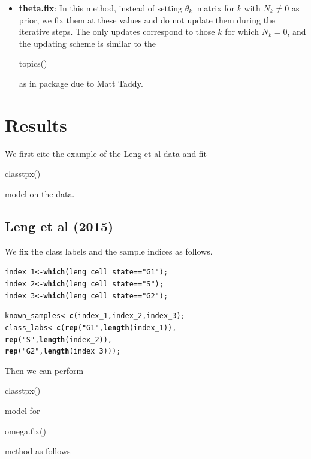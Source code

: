 \documentclass[12pt]{article}\usepackage[]{graphicx}\usepackage[usenames,dvipsnames]{color}
\makeatletter
\newcommand{\hlstr}[1]{\textcolor[rgb]{0.192,0.494,0.8}{#1}}%
\newcommand{\hlopt}[1]{\textcolor[rgb]{0,0,0}{#1}}%
\newcommand{\hlstd}[1]{\textcolor[rgb]{0.345,0.345,0.345}{#1}}%
\newcommand{\hlkwb}[1]{\textcolor[rgb]{0.69,0.353,0.396}{#1}}%
\newcommand{\hlkwd}[1]{\textcolor[rgb]{0.737,0.353,0.396}{\textbf{#1}}}%
\newenvironment{kframe}{%
 \def\at@end@of@kframe{}%
 \ifinner\ifhmode%
  \def\at@end@of@kframe{\end{minipage}}%
  \begin{minipage}{\columnwidth}%
 \fi\fi%
 \def\FrameCommand##1{\hskip\@totalleftmargin \hskip-\fboxsep
 \colorbox{shadecolor}{##1}\hskip-\fboxsep
     \hskip-\linewidth \hskip-\@totalleftmargin \hskip\columnwidth}%
 \MakeFramed {\advance\hsize-\width
   \@totalleftmargin\z@ \linewidth\hsize
   \@setminipage}}%
 {\par\unskip\endMakeFramed%
 \at@end@of@kframe}
\newenvironment{knitrout}{}{} %
\makeatother
\begin{document}
\begin{itemize}
\item \textbf{theta.fix}: In this method, instead of setting $\theta_{k.}$ matrix for $k$ with $N_{k} \neq 0$ as prior, we fix them at these values and do not update them during the iterative steps. The only updates correspond to those $k$ for which $N_{k} = 0$, and the updating scheme is similar to the \begin{verb} topics() \end{verb} as in  package due to Matt Taddy.
\end{itemize}

\section{Results}

We first cite the example of the Leng et al data and fit \begin{verb} classtpx() \end{verb} model on the data. 

\subsection{Leng et al (2015)}

We fix the class labels and the sample indices as follows.

\begin{knitrout}
\color{fgcolor}\begin{kframe}
\begin{alltt}
\hlstd{index_1} \hlkwb{<-} \hlkwd{which}\hlstd{(leng_cell_state}\hlopt{==}\hlstr{"G1"}\hlstd{);}
\hlstd{index_2} \hlkwb{<-} \hlkwd{which}\hlstd{(leng_cell_state}\hlopt{==}\hlstr{"S"}\hlstd{);}
\hlstd{index_3} \hlkwb{<-} \hlkwd{which}\hlstd{(leng_cell_state}\hlopt{==}\hlstr{"G2"}\hlstd{);}

\hlstd{known_samples} \hlkwb{<-} \hlkwd{c}\hlstd{(index_1, index_2, index_3);}
\hlstd{class_labs} \hlkwb{<-} \hlkwd{c}\hlstd{(}\hlkwd{rep}\hlstd{(}\hlstr{"G1"}\hlstd{,} \hlkwd{length}\hlstd{(index_1)),}
                \hlkwd{rep}\hlstd{(}\hlstr{"S"}\hlstd{,} \hlkwd{length}\hlstd{(index_2)),}
                \hlkwd{rep}\hlstd{(}\hlstr{"G2"}\hlstd{,} \hlkwd{length}\hlstd{(index_3)));}
\end{alltt}
\end{kframe}
\end{knitrout}

Then we can perform \begin{verb} classtpx() \end{verb} model for \begin{verb} omega.fix() \end{verb} method as follows 
\end{document}
